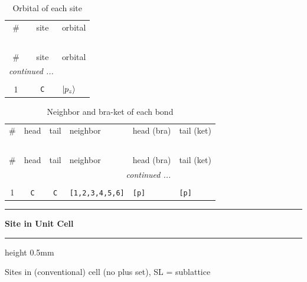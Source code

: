 \documentclass[fleqn,10pt,landscape]{jsarticle}
\begin{document}
\renewcommand{\arraystretch}{1.6}
\begin{longtable}[l]{ccl}
\captionsetup{justification=raggedright, singlelinecheck=off}
\caption{Orbital of each site}
 \\
 \hline \hline
\# & site & orbital \\ \hline \endfirsthead

\multicolumn{2}{l}{\tablename\ \thetable{}} \\
 \hline \hline
\# & site & orbital \\ \hline \endhead

 \hline \hline
\multicolumn{2}{r}{\footnotesize\it continued ...} \\ \endfoot

 \hline \hline
\multicolumn{2}{r}{} \\ \endlastfoot

1 & \texttt{C} & $\ket{p_{z}}$ \\
\end{longtable}
\renewcommand{\arraystretch}{1.6}
\begin{longtable}[l]{ccclll}
\captionsetup{justification=raggedright, singlelinecheck=off}
\caption{Neighbor and bra-ket of each bond}
 \\
 \hline \hline
\# & head & tail & neighbor & head (bra) & tail (ket) \\ \hline \endfirsthead

\multicolumn{5}{l}{\tablename\ \thetable{}} \\
 \hline \hline
\# & head & tail & neighbor & head (bra) & tail (ket) \\ \hline \endhead

 \hline \hline
\multicolumn{5}{r}{\footnotesize\it continued ...} \\ \endfoot

 \hline \hline
\multicolumn{5}{r}{} \\ \endlastfoot

1 & \texttt{C} & \texttt{C} & \texttt{[1,2,3,4,5,6]} & \texttt{[p]} & \texttt{[p]} \\
\end{longtable}
\vspace{5mm}
\noindent \rule[0.5mm]{5mm}{0.5mm}\hspace{3mm}\textbf{Site in Unit Cell}\hspace{3mm}\leaders\hrule height 0.5mm\hfill\kern0pt
\vspace{3mm}

\noindent Sites in (conventional) cell (no plus set), SL = sublattice
\end{document}
